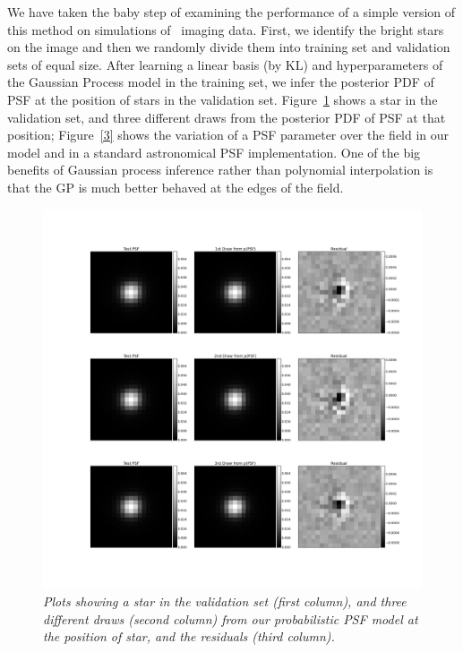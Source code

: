\documentclass[12pt]{article}
\begin{document}
We have taken the baby step of examining the performance of a simple version of this method on simulations 
of \lsst\ imaging data. First, we identify the bright stars on the image and then we randomly divide
them into training set and validation sets of equal size. After learning a linear basis (by KL) and 
hyperparameters of the Gaussian Process model in the training set, we infer the posterior 
PDF of PSF at the position of stars in the validation set. Figure~\ref{1} shows a star
in the validation set, and three different draws from the posterior PDF of PSF at that position;
Figure~\ref{3} shows the variation of a PSF parameter over the field
in our model and in a standard astronomical PSF implementation.
One of the big benefits of Gaussian process inference rather than
polynomial interpolation is that the GP is much better behaved at the
edges of the field.
\begin{figure}[!ht]
\noindent
{}
  \includegraphics[width=\linewidth]{112.png}
\endminipage
\caption{\textsl{Plots showing a star in the validation set
(first column), and three different draws (second column)
from our probabilistic PSF model at the
position of star, and the residuals (third column).}\label{1}}
\end{figure}
\end{document}
